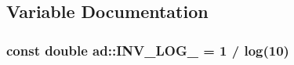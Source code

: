 \subsection{Variable Documentation}
\hypertarget{namespacead_a88262c084c2067846cb7236158296e90}{
\subsubsection[{I\-N\-V\-\_\-\-L\-O\-G\-\_\-10}]{\setlength{\rightskip}{0pt plus 5cm}const double {\bf ad\-::\-I\-N\-V\-\_\-\-L\-O\-G\-\_} = 1 / log(10)}}\label{namespacead_a88262c084c2067846cb7236158296e90}
